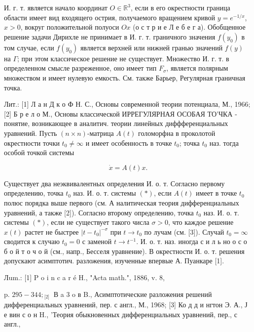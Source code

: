 \documentclass[10pt]{article}
\begin{document}
И. г. т. является начало координат $O \in \mathbb{R}^{3}$, если в его окрестности граница области имеет вид входящего острия, получаемого вращением кривой $y=e^{-1 / x}$, $x>0$, вокруг положительной полуоси $O x$ (о с т р и е Л е б е г а). Обобщенное решение задачи Дирихле не принимает в И. г. т. граничного значения $f\left(y_{0}\right)$ в том случае, если $f\left(y_{0}\right)$ является верхней или нижней гранью значений $f(y)$ на $\Gamma$; при этом классическое решение не существует. Множество И. г. т. в определенном смысле разреженное, оно имеет тип $F_{\sigma}$, является полярным множеством и имеет нулевую емкость. См. также Барьер, Регулярная граничная точка.



Лит.: [1] Л а н Д к о Ф Н. С., Основы современной теории потенциала, М., 1966; [2] Б р е л о М., Основы классической ИРРЕГУЛЯРНАЯ ОСОБАЯ ТО'ЧКА - понятие, возникающее в аналитич. теории линейных диффференциальных уравнений. Пусть $(n \times n)$-матрица $A(t)$ голоморфна в проколотой окрестности точки $t_{0} \neq \infty$ и имеет особенность в точке $t_{0}$; точка $t_{0}$ наз. тогда особой точкой системы



\[

\dot{x}=A(t) x .

\]



Существует два неэквивалентных определения И. о. т. Согласно первому определению, точка $t_{0}$ наз. И. о. т. системы $(*)$, если $A(t)$ имеет в точке $t_{0}$ полюс порядка выше первого (см. А налитическая теория дифференциальных уравнений, а также [2]). Согласно второму определению, точка $t_{0}$ наз. И. о. т. системы $(*)$, если не существует такого числа $\sigma>0$, что каждое решение $x(t)$ растет не быстрее $\left|t-t_{0}\right|^{-\sigma}$ при $t \rightarrow t_{0}$ по лучам (см. [3]). Случай $t_{0}=\infty$ сводится к случаю $t_{0}=0$ с заменой $t \rightarrow t^{-1}$. И. о. т. наз. иногда с и л ь но о с о б о й т о ч о й (см., напр., Бесселя уравнение). В окрестности И. о. т. решения допускают асимптотич. разложения, изученные впервые А. Пуанкаре [1].



Лum.: [1] P o i n c a r é H., "Acta math.", 1886, v. 8,

p. $295-344 ;{ }_{\text {[2] }}$ В a 3 o в B., Асимптотические разложения решений дифференциальных уравнений, пер. с англ., М., 1968; [3] Ко д д и нгтон Э. А., Ј е вин с о н H., 'Теория обыкновенных дифференциальных уравнений, пер., с англ.,
\end{document}
